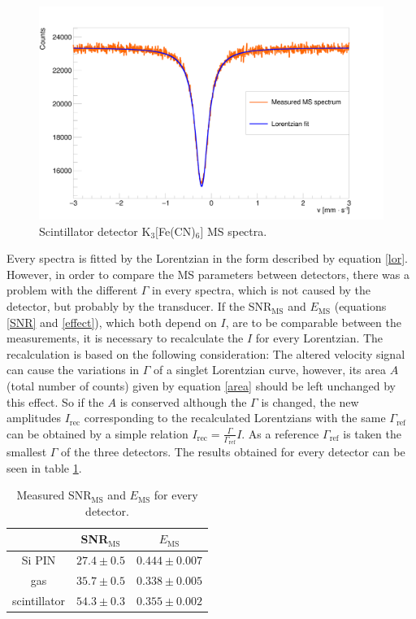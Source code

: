 \begin{figure}[H]
\centering
\includegraphics[scale=0.125, angle = 0]{./pictures/MossPMT.png}
\caption{Scintillator detector K$_{3}[$Fe(CN)$_{6}]$ MS spectra.}
\label{Scintillator detector MS spectra.}

\end{figure}


Every spectra is fitted by the Lorentzian in the form described by equation \ref{lor}. However, in order to compare the MS parameters between detectors, there was a problem with the different $\Gamma$ in every spectra, which is not caused by the detector, but probably by the transducer. If the SNR$_{\textrm{MS}}$ and $E_{\textrm{MS}}$ (equations \ref{SNR} and \ref{effect}), which both depend on $I$, are to be comparable between the measurements, it is necessary to recalculate the $I$ for every Lorentzian. The recalculation is based on the following consideration: The altered velocity signal can cause the variations in $\Gamma$ of a singlet Lorentzian curve, however, its area $A$ (total number of counts) given by equation \ref{area} should be left unchanged by this effect. So if the $A$ is conserved although the $\Gamma$ is changed, the new amplitudes $I_{\textrm{rec}}$ corresponding to the recalculated Lorentzians with the same $\Gamma_{\textrm{ref}}$  can be obtained by a simple relation $I_{\textrm{rec}} = \frac{\Gamma}{\Gamma_{\textrm{ref}}}I$. As a reference $\Gamma_{\textrm{ref}}$ is taken the smallest $\Gamma$ of the three detectors.
The results obtained for every detector can be seen in table \ref{mossres}.

\begin{table}[H]
\centering
\begin{tabular}{|c|c|c|}
\hline
   & SNR$_{\textrm{MS}}$ & $E_{\textrm{MS}}$ \\ \hline
Si PIN & $27.4 \pm 0.5$    & $0.444 \pm 0.007$  \\ \hline
gas & $35.7 \pm 0.5$    & $0.338 \pm 0.005$ \\ \hline
scintillator  & $54.3 \pm 0.3$    & $0.355 \pm 0.002$ \\ \hline
\end{tabular}
\caption{Measured SNR$_{\textrm{MS}}$ and $E_{\textrm{MS}}$ for every detector.}
 \label{mossres}
\end{table}


